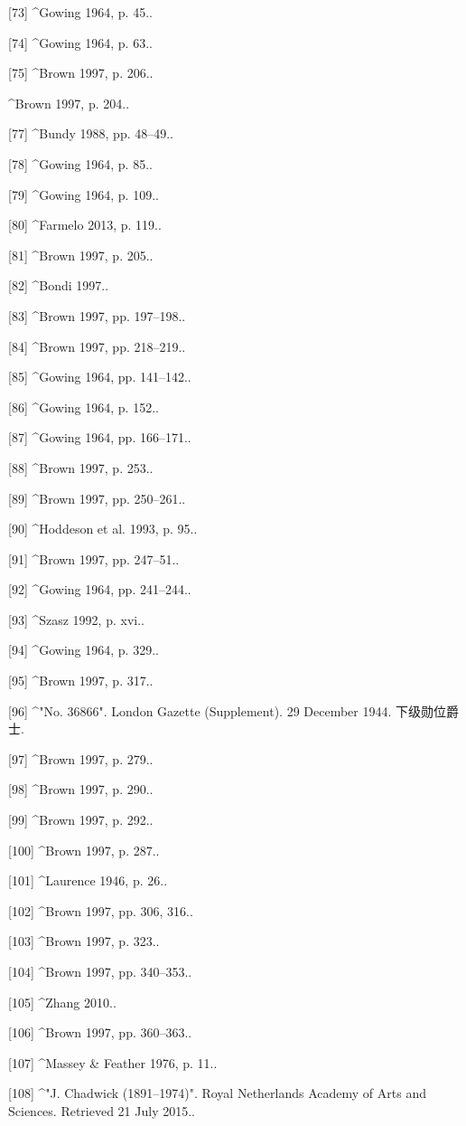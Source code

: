 [73]
^Gowing 1964, p. 45..

[74]
^Gowing 1964, p. 63..

[75]
^Brown 1997, p. 206..

^Brown 1997, p. 204..

[77]
^Bundy 1988, pp. 48–49..

[78]
^Gowing 1964, p. 85..

[79]
^Gowing 1964, p. 109..

[80]
^Farmelo 2013, p. 119..

[81]
^Brown 1997, p. 205..

[82]
^Bondi 1997..

[83]
^Brown 1997, pp. 197–198..

[84]
^Brown 1997, pp. 218–219..

[85]
^Gowing 1964, pp. 141–142..

[86]
^Gowing 1964, p. 152..

[87]
^Gowing 1964, pp. 166–171..

[88]
^Brown 1997, p. 253..

[89]
^Brown 1997, pp. 250–261..

[90]
^Hoddeson et al. 1993, p. 95..

[91]
^Brown 1997, pp. 247–51..

[92]
^Gowing 1964, pp. 241–244..

[93]
^Szasz 1992, p. xvi..

[94]
^Gowing 1964, p. 329..

[95]
^Brown 1997, p. 317..

[96]
^"No. 36866". London Gazette (Supplement). 29 December 1944. 下级勋位爵士.

[97]
^Brown 1997, p. 279..

[98]
^Brown 1997, p. 290..

[99]
^Brown 1997, p. 292..

[100]
^Brown 1997, p. 287..

[101]
^Laurence 1946, p. 26..

[102]
^Brown 1997, pp. 306, 316..

[103]
^Brown 1997, p. 323..

[104]
^Brown 1997, pp. 340–353..

[105]
^Zhang 2010..

[106]
^Brown 1997, pp. 360–363..

[107]
^Massey & Feather 1976, p. 11..

[108]
^"J. Chadwick (1891–1974)". Royal Netherlands Academy of Arts and Sciences. Retrieved 21 July 2015..

